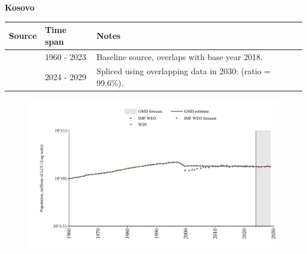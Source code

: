 \documentclass[12pt,a4paper,landscape]{article}
\begin{document}
\begin{adjustbox}{max totalsize={\paperwidth}{\paperheight},center}
\begin{minipage}[t][\textheight][t]{\textwidth}
\vspace*{0.5cm}
{}
\begin{center}
{\Large\bfseries Kosovo}
\end{center}
\vspace{0.5cm}
\begin{table}[H]
\centering
\small
\begin{tabular}{|l|l|l|}
\hline
\textbf{Source} & \textbf{Time span} & \textbf{Notes} \\
\hline
\rowcolor{white}\cite{WDI}& 1960 - 2023 &Baseline source, overlaps with base year 2018.\\
\rowcolor{lightgray}\cite{IMF_WEO_forecast}& 2024 - 2029 &Spliced using overlapping data in 2030: (ratio = 99.6\%).\\
\hline
\end{tabular}
\end{table}
\begin{figure}[H]
\centering
\includegraphics[width=\textwidth,height=0.6\textheight,keepaspectratio]{graphs/XKX_pop.pdf}
\end{figure}
\end{minipage}
\end{adjustbox}
\end{document}
